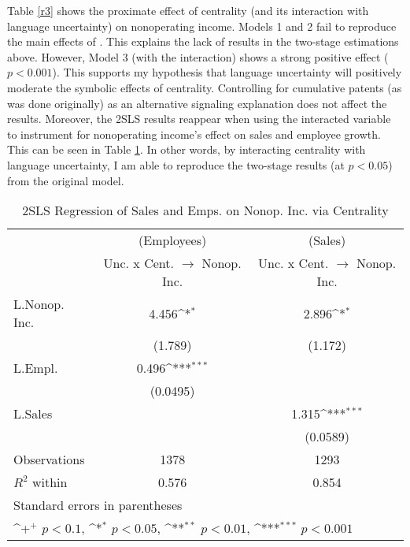 Table \ref{r3} shows the proximate effect of centrality (and its interaction with language uncertainty) on nonoperating income. Models 1 and 2 fail to reproduce the main effects of \citet{powell1999}. This explains the lack of results in the two-stage estimations above. However, Model 3 (with the interaction) shows a strong positive effect ($p < 0.001$). This supports my hypothesis that language uncertainty will positively moderate the symbolic effects of centrality. Controlling for cumulative patents (as was done originally) as an alternative signaling explanation does not affect the results. Moreover, the 2SLS results reappear when using the interacted variable to instrument for nonoperating income's effect on sales and employee growth. This can be seen in Table \ref{r4}. In other words, by interacting centrality with language uncertainty, I am able to reproduce the two-stage results (at $p < 0.05$) from the original model.

\begin{table}[htbp]\centering \caption[Regression of Sales and Emps. on Nonop. Inc. via Centrality]{2SLS Regression of Sales and Emps. on Nonop. Inc. via Centrality\label{r4}}
{
\def\sym#1{\ifmmode^{#1}\else\(^{#1}\)\fi}
\begin{tabular}{l*{2}{c}}
\hline\hline
                    &\multicolumn{1}{c}{(Employees)}&\multicolumn{1}{c}{(Sales)}\\
                    &\multicolumn{1}{c}{Unc. x Cent. $\rightarrow$ Nonop. Inc.}&\multicolumn{1}{c}{Unc. x Cent. $\rightarrow$ Nonop. Inc.}\\
\hline
L.Nonop. Inc.     &       4.456\sym{*}  &       2.896\sym{*}  \\
                    &     (1.789)         &     (1.172)         \\
L.Empl.         &       0.496\sym{***}&                     \\
                    &    (0.0495)         &                     \\
L.Sales             &                     &       1.315\sym{***}\\
                    &                     &    (0.0589)         \\
\hline
Observations        &        1378         &        1293         \\
$R^2$ within                &       0.576         &       0.854         \\
\hline\hline
\multicolumn{3}{l}{\footnotesize Standard errors in parentheses}\\
\multicolumn{3}{l}{\footnotesize \sym{+} \(p<0.1\), \sym{*} \(p<0.05\), \sym{**} \(p<0.01\), \sym{***} \(p<0.001\)}\\
\end{tabular}
}
\end{table}

